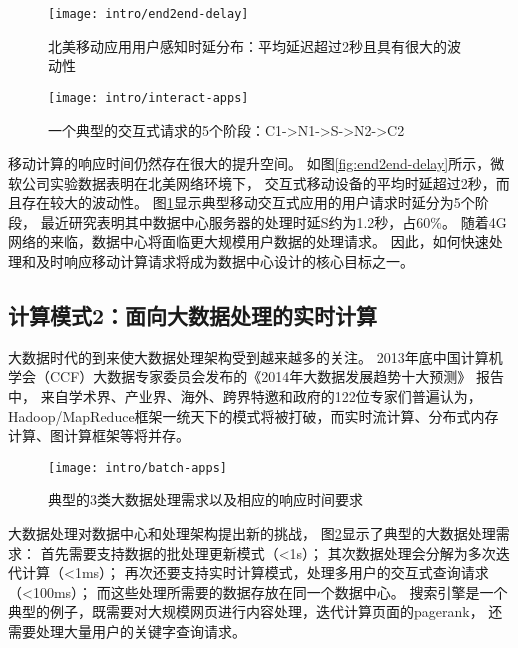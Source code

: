 \begin{figure}
\begin{minipage}{0.48\textwidth}
  \centering
  \texttt{[image: intro/end2end-delay]}
  \caption[北美移动应用用户感知时延分布]{北美移动应用用户感知时延分布：平均延迟超过2秒且具有很大的波动性}
  \label{fig:end2end-delay}
\end{minipage}\hfill
\begin{minipage}{0.48\textwidth}
  \centering
  \texttt{[image: intro/interact-apps]}
  \caption[一个典型的交互式请求的5个阶段]{一个典型的交互式请求的5个阶段：C1->N1->S->N2->C2 \cite{timecard2013}}
  \label{fig:interact-apps}
\end{minipage}
\end{figure}

移动计算的响应时间仍然存在很大的提升空间。
如图\ref{fig:end2end-delay}所示，微软公司实验数据表明在北美网络环境下，
交互式移动设备的平均时延超过2秒，而且存在较大的波动性。
图\ref{fig:interact-apps}显示典型移动交互式应用的用户请求时延分为5个阶段，
最近研究\cite{timecard2013}表明其中数据中心服务器的处理时延S约为1.2秒，占60\%。
随着4G网络的来临，数据中心将面临更大规模用户数据的处理请求。
因此，如何快速处理和及时响应移动计算请求将成为数据中心设计的核心目标之一。


\subsection*{计算模式2：面向大数据处理的实时计算}

大数据时代的到来使大数据处理架构受到越来越多的关注。
2013年底中国计算机学会（CCF）大数据专家委员会发布的《2014年大数据发展趋势十大预测》 报告中，
来自学术界、产业界、海外、跨界特邀和政府的122位专家们普遍认为，
Hadoop/MapReduce框架一统天下的模式将被打破，而实时流计算、分布式内存计算、图计算框架等将并存。

\begin{figure}[H]
  \centering
  \texttt{[image: intro/batch-apps]}
  \caption{典型的3类大数据处理需求以及相应的响应时间要求}
  \label{fig:batch-apps}
\end{figure}


大数据处理对数据中心和处理架构提出新的挑战，
图\ref{fig:batch-apps}显示了典型的大数据处理需求：
首先需要支持数据的批处理更新模式（<1s）；
其次数据处理会分解为多次迭代计算（<1ms）；
再次还要支持实时计算模式，处理多用户的交互式查询请求（<100ms）；
而这些处理所需要的数据存放在同一个数据中心。
搜索引擎是一个典型的例子，既需要对大规模网页进行内容处理，迭代计算页面的pagerank，
还需要处理大量用户的关键字查询请求。

